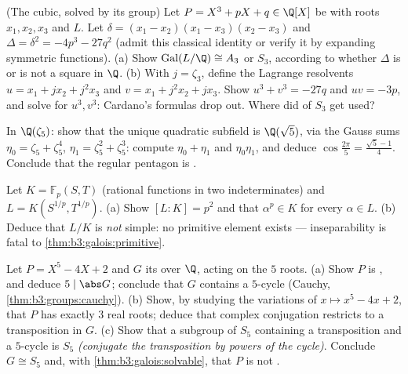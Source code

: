 \begin{exercise}[$\star\star$]\label{exo:b3:galois:8}
(The cubic, solved by its group) Let $P = X^3 + pX + q \in
\Q[X]$ be  with roots $x_1, x_2, x_3$ and  $L$. Let $\delta = (x_1 - x_2)(x_1 - x_3)(x_2 - x_3)$ and
$\Delta = \delta^2 = -4p^3 - 27q^2$ (admit this classical
identity or verify it by expanding symmetric functions).
(a) Show $\operatorname{Gal}(L/\Q) \cong A_3$ or $S_3$, according
to whether $\Delta$ is or is not a square in $\Q$.
(b) With $j = \zeta_3$, define the Lagrange resolvents $u = x_1
+ jx_2 + j^2x_3$ and $v = x_1 + j^2x_2 + jx_3$. Show $u^3 + v^3
= -27q$ and $uv = -3p$, and solve for $u^3, v^3$: Cardano's
formulas drop out. Where did  of $S_3$ get used?
\end{exercise}

\begin{exercise}[$\star\star$]\label{exo:b3:galois:9}
In $\Q(\zeta_5)$: show that the unique quadratic subfield is
$\Q(\sqrt5)$, via the Gauss sums $\eta_0 = \zeta_5 + \zeta_5^4$,
$\eta_1 = \zeta_5^2 + \zeta_5^3$: compute $\eta_0 + \eta_1$ and
$\eta_0\eta_1$, and deduce $\cos\frac{2\pi}5 = \frac{\sqrt5 -
1}4$. Conclude that the regular pentagon is .
\end{exercise}

\begin{exercise}[$\star\star\star$]\label{exo:b3:galois:10}
Let $K = \mathbb F_p(S, T)$ (rational functions in two
indeterminates) and $L = K(S^{1/p}, T^{1/p})$.
(a) Show $[L:K] = p^2$ and that $\alpha^p \in K$ for every
$\alpha \in L$.
(b) Deduce that $L/K$ is \emph{not} simple: no primitive element
exists --- inseparability is fatal to
\cref{thm:b3:galois:primitive}.
\end{exercise}

\begin{exercise}[$\star\star\star$]\label{exo:b3:galois:11}
Let $P = X^5 - 4X + 2$ and $G$ its  over $\Q$,
acting on the $5$ roots.
(a) Show $P$ is , and deduce $5 \mid \abs G$; conclude
that $G$ contains a $5$-cycle (Cauchy,
\cref{thm:b3:groups:cauchy}).
(b) Show, by studying the variations of $x \mapsto x^5 - 4x +
2$, that $P$ has exactly $3$ real roots; deduce that complex
conjugation restricts to a transposition in $G$.
(c) Show that a subgroup of $S_5$ containing a transposition and
a $5$-cycle is $S_5$ \emph{(conjugate the transposition by
powers of the cycle)}. Conclude $G \cong S_5$ and, with
\cref{thm:b3:galois:solvable}, that $P$ is not .
\end{exercise}


